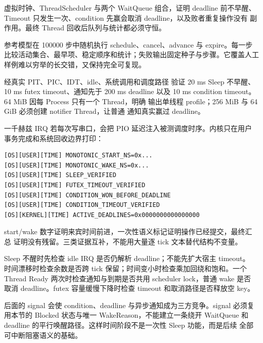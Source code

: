虚拟时钟、ThreadScheduler 与两个 WaitQueue 组合，证明 deadline 前不早醒、
Timeout 只发生一次、condition 先赢会取消 deadline，以及败者重复操作没有
副作用。最终 Thread 回收后队列与统计都必须守恒。

参考模型在 100000 步中随机执行 schedule、cancel、advance 与 expire。每一步
比较活动集合、最早项、稳定顺序和统计；失败输出固定种子与步骤。它覆盖人工
样例难以穷举的长交错，又保持完全可复现。

 经真实 PIT、PIC、IDT、idle、系统调用和调度路径
验证 20 ms Sleep 不早醒、10 ms futex timeout、通知先于 200 ms deadline
以及 10 ms condition timeout。64 MiB 因每 Process 只有一个 Thread，明确
输出单线程 profile；256 MiB 与 64 GiB 必须创建 notifier Thread，让普通
通知真实赢过 deadline。

一千赫兹 IRQ 若每次写串口，会把 PIO 延迟注入被测调度时序。内核只在用户
事务完成和系统回收边界打印：

\begin{lstlisting}
[OS][USER][TIME] MONOTONIC_START_NS=0x...
[OS][USER][TIME] MONOTONIC_WAKE_NS=0x...
[OS][USER][TIME] SLEEP_VERIFIED
[OS][USER][TIME] FUTEX_TIMEOUT_VERIFIED
[OS][USER][TIME] CONDITION_WON_BEFORE_DEADLINE
[OS][USER][TIME] CONDITION_TIMEOUT_VERIFIED
[OS][KERNEL][TIME] ACTIVE_DEADLINES=0x0000000000000000
\end{lstlisting}

start/wake 数字证明来宾时间前进，一次性语义标记证明操作已经提交，最终汇总
证明没有残留。三类证据互补，不能用大量逐 tick 文本替代结构不变量。

Sleep 不醒时先检查 idle IRQ 是否仍解析 deadline；不能先扩大宿主 timeout。
时间漂移时检查余数是否跨 tick 保留；时间变小时检查乘加回绕和饱和。一个
Thread Ready 两次时检查通知与到期是否共用 scheduler lock，普通 wake 是否
取消 deadline。futex 容量缓慢下降时检查 timeout 和取消路径是否释放空 key。

后面的 signal 会使 condition、deadline 与异步通知成为三方竞争。signal
必须复用本节的 Blocked 状态与唯一 WakeReason，不能建立一条绕开 WaitQueue
和 deadline 的平行唤醒路径。这样时间阶段不是一次性 Sleep 功能，而是后续
全部可中断阻塞语义的基础。
